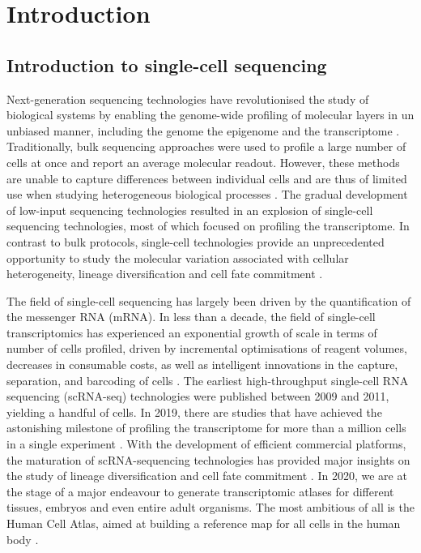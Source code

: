 \graphicspath{{Introduction/Figs/}}

\chapter{Introduction}

\section{Introduction to single-cell sequencing}

Next-generation sequencing technologies have revolutionised the study of biological systems by enabling the genome-wide profiling of molecular layers in un unbiased manner, including the genome \cite{Fleischmann1995} the epigenome \cite{Frommer1992} and the transcriptome \cite{Lister2008,Bainbridge2006,Nagalakshmi2008,Mortazavi2008}. Traditionally, bulk sequencing approaches were used to profile a large number of cells at once and report an average molecular readout. However, these methods are unable to capture differences between individual cells and are thus of limited use when studying heterogeneous biological processes \cite{Griffiths2018,Papalexi2017,Patel2014}. The gradual development of low-input sequencing technologies resulted in an explosion of single-cell sequencing technologies, most of which focused on profiling the transcriptome. In contrast to bulk protocols, single-cell technologies provide an unprecedented opportunity to study the molecular variation associated with cellular heterogeneity, lineage diversification and cell fate commitment \cite{Kolodziejczyk2015}.

The field of single-cell sequencing has largely been driven by the quantification of the messenger RNA (mRNA). In less than a decade, the field of single-cell transcriptomics has experienced an exponential growth of scale in terms of number of cells profiled, driven by incremental optimisations of reagent volumes, decreases in consumable costs, as well as intelligent innovations in the capture, separation, and barcoding of cells \cite{Svensson2018}. The earliest high-throughput single-cell RNA sequencing (scRNA-seq) technologies were published between 2009 and 2011, yielding a handful of cells. In 2019, there are studies that have achieved the astonishing milestone of profiling the transcriptome for more than a million cells in a single experiment \cite{Cao2019}. With the development of efficient commercial platforms, the maturation of scRNA-sequencing technologies has provided major insights on the study of lineage diversification and cell fate commitment \cite{Kolodziejczyk2015,Griffiths2018,Papalexi2017,Patel2014}. In 2020, we are at the stage of a major endeavour to generate transcriptomic atlases for different tissues, embryos and even entire adult organisms. The most ambitious of all is the Human Cell Atlas, aimed at building a reference map for all cells in the human body \cite{Aviv2017}.

